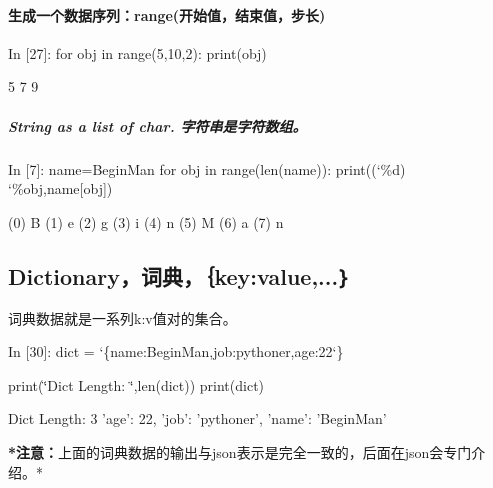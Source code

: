 \documentclass[letterpaper,10pt,english]{sphinxmanual}
\def\PYGZob{\char`\{}
\def\PYGZcb{\char`\}}
\def\PYGZpc{\char`\%}
\def\PYGZsq{\char`\'}
\def\PYGZdq{\char`\"}
\renewcommand\PYGZsq{\textquotesingle}
\begin{document}
\paragraph{生成一个数据序列：range(开始值，结束值，步长)}
\label{pystart_databasic:_u751f_u6210_u4e00_u4e2a_u6570_u636e_u5e8f_u5217_uff1arange(_u5f00_u59cb_u503c_uff0c_u7ed3_u675f_u503c_uff0c_u6b65_u957f)}
\begin{OriginalVerbatim}[commandchars=\\\{\}]
\textcolor{nbsphinxin}{In [27]: }for obj in range(5,10,2):
             print(obj)
\end{OriginalVerbatim}
\begin{OriginalVerbatim}[commandchars=\\\{\}]
5
7
9
\end{OriginalVerbatim}

\subparagraph{String as a list of char. 字符串是字符数组。}
\label{pystart_databasic:String-as-a-list-of-char.-_u5b57_u7b26_u4e32_u662f_u5b57_u7b26_u6570_u7ec4_u3002}
\begin{OriginalVerbatim}[commandchars=\\\{\}]
\textcolor{nbsphinxin}{In [7]: }name=\PYGZsq{}BeginMan\PYGZsq{}
        for obj in range(len(name)):
            print(\PYGZsq{}(\PYGZpc{}d)\PYGZsq{} \PYGZpc{}obj,name[obj])
\end{OriginalVerbatim}
\begin{OriginalVerbatim}[commandchars=\\\{\}]
(0) B
(1) e
(2) g
(3) i
(4) n
(5) M
(6) a
(7) n
\end{OriginalVerbatim}

\subsection{Dictionary，词典，｛key:value,...｝}
\label{pystart_databasic:Dictionary_uff0c_u8bcd_u5178_uff0c_uff5bkey:value,..._uff5d}
词典数据就是一系列k:v值对的集合。

\begin{OriginalVerbatim}[commandchars=\\\{\}]
\textcolor{nbsphinxin}{In [30]: }dict = \PYGZob{}\PYGZsq{}name\PYGZsq{}:\PYGZsq{}BeginMan\PYGZsq{},\PYGZsq{}job\PYGZsq{}:\PYGZsq{}pythoner\PYGZsq{},\PYGZsq{}age\PYGZsq{}:22\PYGZcb{}
         
         print(\PYGZdq{}Dict Length: \PYGZdq{},len(dict))
         print(dict)
\end{OriginalVerbatim}
\begin{OriginalVerbatim}[commandchars=\\\{\}]
Dict Length:  3
{'age': 22, 'job': 'pythoner', 'name': 'BeginMan'}
\end{OriginalVerbatim}
\textbf{*注意：}上面的词典数据的输出与json表示是完全一致的，后面在json会专门介绍。*
\end{document}
